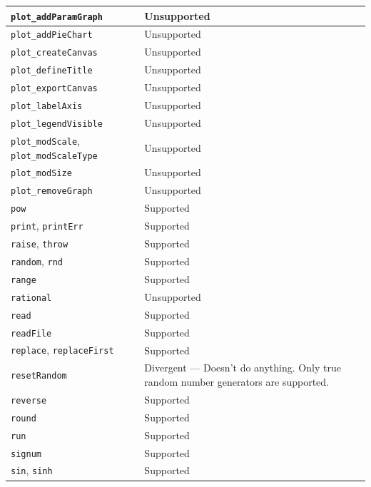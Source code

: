 \begin{longtable}{|p{4cm}|p{9cm}|}
        \hline
        \texttt{plot\_addParamGraph} & Unsupported \\
        \hline
        \texttt{plot\_addPieChart} & Unsupported \\
        \hline
        \texttt{plot\_createCanvas} & Unsupported \\
        \hline
        \texttt{plot\_defineTitle} & Unsupported \\
        \hline
        \texttt{plot\_exportCanvas} & Unsupported \\
        \hline
        \texttt{plot\_labelAxis} & Unsupported \\
        \hline
        \texttt{plot\_legendVisible} & Unsupported \\
        \hline
        \texttt{plot\_modScale}, \texttt{plot\_modScaleType} & Unsupported \\
        \hline
        \texttt{plot\_modSize} & Unsupported \\
        \hline
        \texttt{plot\_removeGraph} & Unsupported \\
        \hline
        \texttt{pow} & Supported \\
        \hline
        \texttt{print}, \texttt{printErr} & Supported \\
        \hline
        \texttt{raise}, \texttt{throw} & Supported \\
        \hline
        \texttt{random}, \texttt{rnd} & Supported \\
        \hline
        \texttt{range} & Supported \\
        \hline
        \texttt{rational} & Unsupported \\
        \hline
        \texttt{read} & Supported \\
        \hline
        \texttt{readFile} & Supported \\
        \hline
        \texttt{replace}, \texttt{replaceFirst} & Supported \\
        \hline
        \texttt{resetRandom} & Divergent --- Doesn't do anything. Only true random number generators are supported. \\
        \hline
        \texttt{reverse} & Supported \\
        \hline
        \texttt{round} & Supported \\
        \hline
        \texttt{run} & Supported \\
        \hline
        \texttt{signum} & Supported \\
        \hline
        \texttt{sin}, \texttt{sinh} & Supported \\

\end{longtable}
